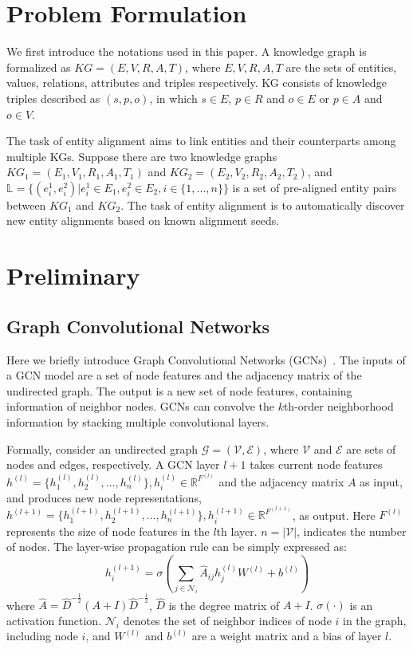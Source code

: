 	
	\section{Problem Formulation}
	We first introduce the notations used in this paper. A knowledge graph is formalized as $KG = (E,V,R,A,T)$, where $E,V,R,A,T$ are the sets of entities, values, relations, attributes and triples respectively. KG consists of knowledge triples described as $(s, p, o)$, in which $s \in E$, $p \in R$ and $o \in E$ or $p \in A$ and $o \in V$.
	
	The task of entity alignment aims to link entities and their counterparts among multiple KGs. Suppose there are two knowledge graphs $KG_1 = (E_1,V_1,R_1,A_1,T_1)$ and $KG_2 = (E_2,V_2,R_2,A_2,T_2)$, and $\mathbb{L} = \{(e_i^1 , e_i^2 )|e_i^1 \in E_1, e_i^2 \in E_2, i\in\{1,...,n\}\}$ is a set of pre-aligned entity pairs between $KG_1$ and $KG_2$. The task of entity alignment is to automatically discover new entity alignments based on known alignment seeds.
	
	\section{Preliminary}
	
	\subsection*{Graph Convolutional Networks}
	\label{section:Graph Convolutional Networks}
	Here we briefly introduce Graph Convolutional Networks (GCNs)~\cite{Kipf2016Semi}. The inputs of a GCN model are a set of node features and the adjacency matrix of the undirected graph. The output is a new set of node features, containing information of neighbor nodes. GCNs can convolve the $k$th-order neighborhood information by stacking multiple convolutional layers.
	
	Formally, consider an undirected graph $\mathcal{G}=(\mathcal{V},\mathcal{E})$, where $\mathcal{V}$ and $\mathcal{E}$ are sets of nodes and edges, respectively. A GCN layer $l+1$ takes current node features $h^{(l)}=\{h_1^{(l)},h_2^{(l)},...,h_n^{(l)}\}, h_i^{(l)} \in \mathbb{R}^{F^{(l)}}$ and the adjacency matrix $A$ as input, and produces new node representations, $h^{(l+1)}=\{h_1^{(l+1)},h_2^{(l+1)},...,h_n^{(l+1)}\}, h_i^{(l+1)} \in \mathbb{R}^{F^{(l+1)}}$, as output. Here $F^{(l)}$ represents the size of node features in the $l$th layer. $n=|\mathcal{V}|$, indicates the number of nodes. The layer-wise propagation rule can be simply expressed as:
	\begin{equation}
		h_i^{(l+1)}=\sigma (\sum_{j \in \mathcal{N}_i}\hat A_{ij}h_j^{(l)}W^{(l)}+b^{(l)})
	\end{equation}
	where $\hat A=\hat D^{- \frac{1}{2}}(A+I)\hat D^{- \frac{1}{2}}$, $\hat D$ is the degree matrix of $A+I$. $\sigma(\cdot)$ is an activation function. $\mathcal{N}_i$ denotes the set of neighbor indices of node $i$ in the graph, including node $i$, and $W^{(l)}$ and $b^{(l)}$ are a weight matrix and a bias of layer $l$.
	
